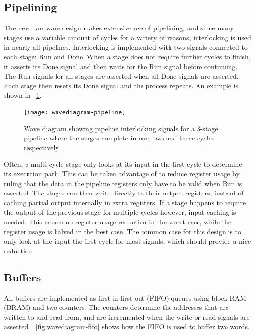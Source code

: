 \subsection{Pipelining}

The new hardware design makes extensive use of pipelining, and since many stages use a variable amount of cycles for a variety of reasons, interlocking is used in nearly all pipelines.
Interlocking is implemented with two signals connected to each stage: Run and Done.
When a stage does not require further cycles to finish, it asserts its Done signal and then waits for the Run signal before continuing.
The Run signals for all stages are asserted when all Done signals are asserted.
Each stage then resets its Done signal and the process repeats.
An example is shown in \figurename~\ref{fig:wavediagram-pipeline}.

\begin{figure}[!ht]
    \centering
    \texttt{[image: wavediagram-pipeline]}
    \caption[Pipeline wave diagram]{
        Wave diagram showing pipeline interlocking signals for a 3-stage pipeline where the stages complete in one, two and three cycles respectively.
    }
    \label{fig:wavediagram-pipeline}
\end{figure}

Often, a multi-cycle stage only looks at its input in the first cycle to determine its execution path.
This can be taken advantage of to reduce register usage by ruling that the data in the pipeline registers only have to be valid when Run is asserted.
The stages can then write directly to their output registers, instead of caching partial output internally in extra registers.
If a stage happens to require the output of the previous stage for multiple cycles however, input caching is needed.
This causes no register usage reduction in the worst case, while the register usage is halved in the best case.
The common case for this design is to only look at the input the first cycle for most signals, which should provide a nice reduction.

\subsection{Buffers}

All buffers are implemented as first-in first-out (FIFO) queues using block RAM (BRAM) and two counters.
The counters determine the addresses that are written to and read from, and are incremented when the write or read signals are asserted.
\figurename~\ref{fig:wavediagram-fifo} shows how the FIFO is used to buffer two words.

